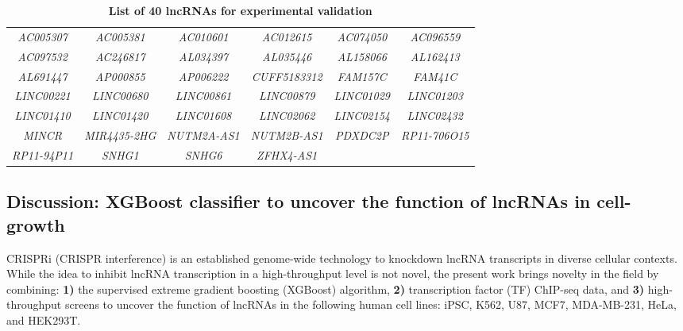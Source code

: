 \begin{table}[!htb]
  \caption[List of 40 lncRNAs for experimental validation]{\textbf{List of 40 lncRNAs for experimental validation}}
  \begin{scriptsize}
    \begin{tabulary}{0.95\linewidth}{cccccc}
      \textit{AC005307} & \textit{AC005381} & \textit{AC010601} & \textit{AC012615} & \textit{AC074050} & \textit{AC096559} \\
      \textit{AC097532} & \textit{AC246817} & \textit{AL034397} & \textit{AL035446} & \textit{AL158066} & \textit{AL162413} \\
      \textit{AL691447} & \textit{AP000855}  & \textit{AP006222} & \textit{CUFF5183312} & \textit{FAM157C} & \textit{FAM41C} \\
      \textit{LINC00221} & \textit{LINC00680} & \textit{LINC00861} & \textit{LINC00879} & \textit{LINC01029} & \textit{LINC01203} \\
      \textit{LINC01410} & \textit{LINC01420} & \textit{LINC01608} & \textit{LINC02062} & \textit{LINC02154} & \textit{LINC02432} \\
      \textit{MINCR} & \textit{MIR4435-2HG} & \textit{NUTM2A-AS1} & \textit{NUTM2B-AS1} & \textit{PDXDC2P} & \textit{RP11-706O15} \\
      \textit{RP11-94P11} & \textit{SNHG1} & \textit{SNHG6} & \textit{ZFHX4-AS1} \\
    \end{tabulary}
  \end{scriptsize}
  \label{tab:lncRNA-validate}
\end{table}

\clearpage

\subsection{Discussion: XGBoost classifier to uncover the function of lncRNAs in cell-growth}
\label{sec:ml-discussion}

CRISPRi (CRISPR interference) is an established genome-wide technology to knockdown lncRNA transcripts in diverse cellular contexts. While the idea to inhibit lncRNA transcription in a high-throughput level is not novel,\autocite{liu_2020_crispri,Haswell_2021_crispri} the present work brings novelty in the field by combining: \textbf{1)} the supervised extreme gradient boosting (XGBoost) algorithm, \textbf{2)} transcription factor (TF) ChIP-seq data, and \textbf{3)} high-throughput screens to uncover the function of lncRNAs in the following human cell lines: iPSC, K562, U87, MCF7, MDA-MB-231, HeLa, and HEK293T. 


